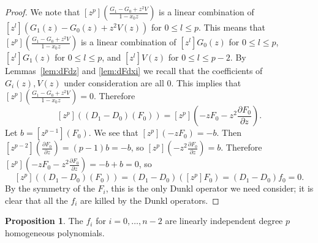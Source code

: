 \documentclass{amsart}
\numberwithin{equation}{section}
\theoremstyle{definition}
\newtheorem{proposition}[theorem]{Proposition}
\begin{document}
\begin{proof}
We note that $[z^p]\left(\frac{G_1-G_0+z^2V}{1-x_0z}\right)$ is a linear combination of $[z^l](G_1(z)-G_0(z)+z^2V(z))$ for $0 \le l \le p$. This means that $[z^p]\left(\frac{G_1-G_0+z^2V}{1-x_0z}\right)$ is a linear combination of $[z^l]G_0(z)$ for $0 \le l \le p$, $[z^l]G_1(z)$ for $0 \le l \le p$, and $[z^l]V(z)$ for $0 \le l \le p-2$. By Lemmas~\ref{lem:dFdz} and \ref{lem:dFdxi} we recall that the coefficients of $G_i(z),V(z)$ under consideration are all $0$. This implies that $[z^p]\left(\frac{G_1-G_0+z^2V}{1-x_0z}\right)=0$. Therefore
\[
[z^p]\left((D_1-D_0)(F_0)\right)=[z^p]\left(-zF_0-z^2\frac{\partial F_0}{\partial z}\right).
\]
Let $b=[z^{p-1}](F_0)$. We see that $[z^p](-zF_0)=-b$. Then $[z^{p-2}]\left(\frac{\partial F_0}{\partial z}\right)=(p-1)b=-b$, so $[z^p]\left(-z^2\frac{\partial F_0}{\partial z}\right)=b$. Therefore $[z^p]\left(-zF_0-z^2\frac{\partial F_0}{\partial z}\right)=-b+b=0$, so 
\[
[z^p]((D_1-D_0)(F_0))=(D_1-D_0)([z^p]F_0)=(D_1-D_0)f_0=0.
\]
By the symmetry of the $F_i$, this is the only Dunkl operator we need consider; it is clear that all the $f_i$ are killed by the Dunkl operators.
\end{proof}

\begin{proposition}\label{prop:linind} The $f_i$ for $i=0,\dots,n-2$ are linearly independent degree $p$ homogeneous polynomials.
\end{proposition} 
\end{document}
